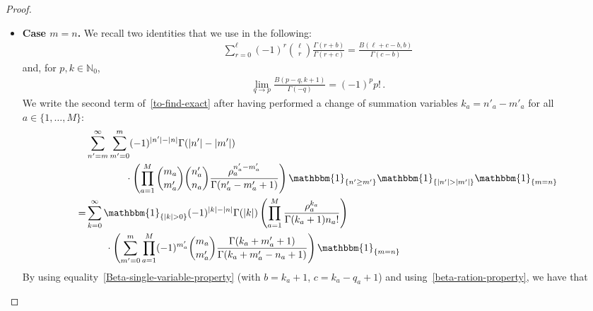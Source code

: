 \documentclass[11pt]{article}
\numberwithin{equation}{section}
\newcommand{\M}{M}
\begin{document}
\begin{proof}
\begin{itemize}
\begin{equation}
\end{equation}
Therefore, we finally obtain that 
\begin{equation}
	\begin{split}
				&\sum_{k=0}^{m}
				\Gamma(|n|-|k|)\left(\prod_{a=1}^{\M}\frac{\binom{m_{a}}{k_{a}}\beta_{a}^{n_{a}-k_{a}}}{\Gamma(n_{a}-k_{a}+1)}\right)
				\left(\sum_{m'=k}^{m}
				(-1)^{|m'|-|k|}\prod_{a=1}^{\M}\binom{m_{a}-k_{a}}{m'_{a}-k_{a}}\right)\,.
		\\=&
		\Gamma(|n|-|m|)\left(\prod_{a=1}^{\M}\frac{\beta_{a}^{n_{a}-m_{a}}}{\Gamma(n_{a}-m_{a}+1)}\right)\,.
	\end{split}
\end{equation} 

\item \textbf{Case $m=n$.}
  We recall two identities that we use in the following:
 \begin{align}\label{Beta-single-variable-property}
 	\sum_{r=0}^{\ell}(-1)^{r}\binom{\ell}{r}\frac{\Gamma(r+b)}{\Gamma(r+c)}=\frac{B(\ell+c-b,b)}{\Gamma(c-b)}
 \end{align}
 and, for $p,k\in \mathbb{N}_{0}$,
 \begin{align}\label{beta-ration-property}
 	\lim_{q\to p}\frac{B(p-q,k+1)}{\Gamma(-q)}=(-1)^{p}p!\,.
 \end{align}
 We write the second term of~\eqref{to-find-exact} after having performed a change of summation variables $ k_{a}=n'_{a}-m'_{a}$ for all $a\in \{1,\ldots,\M\}$:
\begin{equation}
	\begin{split}
		&\sum_{n'=m}^{\infty}
				\sum_{m'=0}^{m}(-1)^{|n'|-|n|}\Gamma(|n'|-|m'|)
				\\&\qquad\qquad\cdot \left(\prod_{a=1}^{\M}\binom{m_{a}}{m'_{a}}\binom{n'_{a}}{n_{a}}\frac{\rho_{a}^{n'_{a}-m'_{a}}}{\Gamma(n'_{a}-m'_{a}+1)}\right)\mathbbm{1}_{\{n'\geq m'\}}\mathbbm{1}_{\{|n'|>|m'|\}}\mathbbm{1}_{\{m=n\}}
												\\=&
		\sum_{k=0}^{\infty}
			\mathbbm{1}_{\{|k|>0\}}(-1)^{|k|-|n|}\Gamma(|k|)\left(\prod_{a=1}^{\M}\frac{\rho_{a}^{k_{a}}}{\Gamma(k_{a}+1)n_{a}!}\right)
		\\&\qquad \cdot \left(\sum_{m'=0}^{m}
			\prod_{a=1}^{\M}(-1)^{m'_{a}}\binom{m_{a}}{m'_{a}}\frac{\Gamma(k_{a}+m'_{a}+1)}{\Gamma(k_{a}+m'_{a}-n_{a}+1)}\right)\mathbbm{1}_{\{m=n\}}
		\end{split}
	\end{equation}
	By using equality~\eqref{Beta-single-variable-property} (with $b=k_{a}+1$, $c=k_a-q_a+1$) and using~\eqref{beta-ration-property}, we have that 

\end{itemize}
\end{proof}
\end{document}
